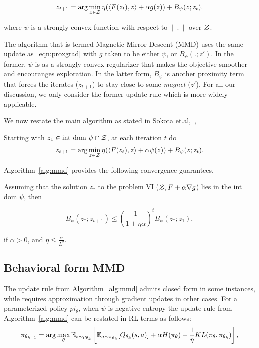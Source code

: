 \begin{equation}
	\label{eqn:proxgrad} z_{t+1} = \arg \min_{z \in \mathcal{Z}} \eta (\langle F(z_t), z\rangle + \alpha
	g(z)) + B_{\psi} (z; z_t).
\end{equation}

where $\psi$ is a strongly convex function with respect to $\|.\|$ over $\mathcal{Z}$.

The algorithm that is termed Magnetic Mirror Descent (MMD) uses the same update as~\ref{eqn:proxgrad} with $g$ taken to be
either $\psi$, or $B_{\psi}(.;z')$. In the former, $\psi$ is as a strongly convex regularizer that makes the objective smoother and encouranges 
exploration. In the latter form, $B_{\psi}$ is another proximity term that forces the iterates ($z_{t+1}$) to stay close to some  
\textit{magnet} ($z'$). For all our discussion, we only consider the former update rule which is more widely 
applicable.

We now restate the main algorithm as stated in Sokota et.al,~\cite{sokotaUnified2023},

\begin{alprocedure}[H]  \label{alg:mmd} Starting with $z_1 \in \text{int dom } \psi \cap \mathcal{Z}$,
	at each iteration $t$ do $$ z_{t+1} = \arg \min_{z \in \mathcal{Z}} \eta (\langle F(z_t), z\rangle +
		\alpha \psi(z)) + B_{\psi} (z; z_t).
	$$
\end{alprocedure}

\hfill \break
Algorithm~\ref{alg:mmd} provides the following convergence guarantees.
\begin{theorem}
	\label{thm:mmdconv}
	\cite[Theorem 3.4]{sokotaUnified2023}
	Assuming that the solution $z_{\ast}$ to the problem VI ($\mathcal{Z}, F + \alpha \nabla g$) lies in the
	int dom $\psi$, then

	\[ B_{\psi} (z_{\ast}; z_{t + 1}) \leq {\left(\frac{1}{1 +
				\eta \alpha}\right)}^t B_{\psi} (z_{\ast}; z_1), \]

	if $\alpha > 0$, and $\eta
		\leq \frac{\alpha}{L^2}$.
\end{theorem}

\subsection{Behavioral form MMD}

The update rule from Algorithm~\ref{alg:mmd} admits closed form in some instances, while requires approximation 
through gradient updates in other cases.
For a parameterized policy $pi_\theta$, when $\psi$ is negative entropy the update rule from Algorithm~\ref{alg:mmd} can be restated in 
RL terms as follows:
\begin{equation}
	\label{eqn:mmdbf} \pi_{\theta_{k+1}}
	= \arg \max_{\theta} \mathbb{E}_{s \sim \rho_{\theta_k}} \left[ \mathbb{E}_{a \sim \pi_{\theta_k}} [Q_{\theta_k}(s, a)] + \alpha H(\pi_\theta) - \frac{1}{\eta} KL(\pi_\theta, \pi_{\theta_k}) \right],
\end{equation}

